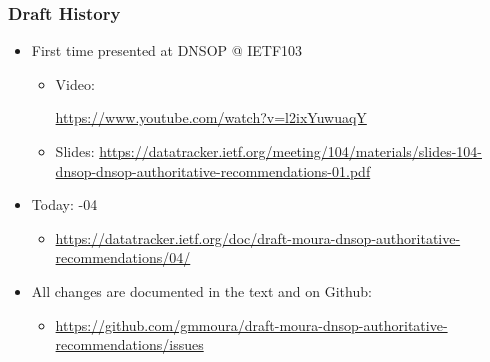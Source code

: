 \documentclass[11pt,show 
notes,notheorems,noamsthm,blank]{beamer} %
\begin{document}
\begin{frame}
\frametitle{Draft History}


\begin{itemize}


\item  First time presented at DNSOP  @ IETF103
    \begin{itemize}
     \item Video: \begin{tiny} \url{https://www.youtube.com/watch?v=l2ixYuwuaqY} \end{tiny}
     \item Slides: \tiny  \url{https://datatracker.ietf.org/meeting/104/materials/slides-104-dnsop-dnsop-authoritative-recommendations-01.pdf}
    \end{itemize}
    
\item Today: -04 
\begin{itemize}
 \item   \begin{tiny}  \url{https://datatracker.ietf.org/doc/draft-moura-dnsop-authoritative-recommendations/04/} \end{tiny}
\end{itemize}

\item All changes are documented in the text and on Github:
\begin{itemize}
 \item \begin{tiny}  \url{https://github.com/gmmoura/draft-moura-dnsop-authoritative-recommendations/issues} \end{tiny}
\end{itemize}






\end{itemize}
\end{frame}
\end{document}
